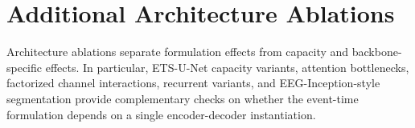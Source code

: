 \documentclass[12pt]{article}
\begin{document}
\section{Additional Architecture Ablations}

Architecture ablations separate formulation effects from capacity and backbone-specific effects. In particular, ETS-U-Net capacity variants, attention bottlenecks, factorized channel interactions, recurrent variants, and EEG-Inception-style segmentation provide complementary checks on whether the event-time formulation depends on a single encoder-decoder instantiation.

\FloatBarrier
\clearpage







% 




\end{document}

